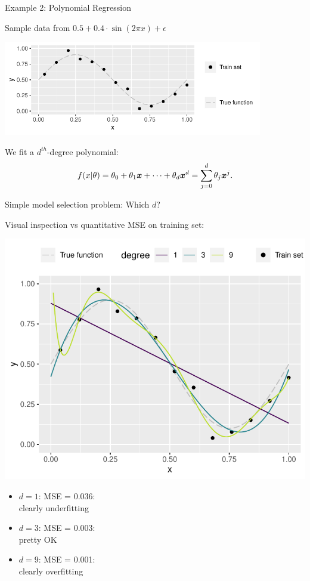 \begin{vbframe}{Example 2: Polynomial Regression}

Sample data from
$0.5 + 0.4 \cdot \sin (2 \pi x) + \epsilon$

\vfill

\begin{center}
  \includegraphics[width=0.85\textwidth]{figure/eval_train_1}
\end{center}

We fit a $d^{th}$-degree polynomial:
\[ f(x | \theta) = \theta_0 + \theta_1 \bm{x} + \cdots + \theta_d \bm{x}^d = \sum_{j = 0}^{d}
\theta_j \bm{x}^j\text. \]

\framebreak

Simple model selection problem: Which $d$?

\vfill

Visual inspection vs quantitative MSE on training set:

\begin{minipage}[c]{0.6\textwidth}
  \includegraphics[width=\textwidth]{figure/eval_train_2} 
\end{minipage}%
\begin{minipage}[c]{0.4\textwidth}
  \begin{itemize}
    \footnotesize
    \item $d = 1$: MSE = 0.036: \\clearly underfitting
    \item $d = 3$: MSE = 0.003: \\pretty OK
    \item $d = 9$: MSE = 0.001: \\clearly overfitting
  \end{itemize}
\end{minipage}


\end{vbframe}
